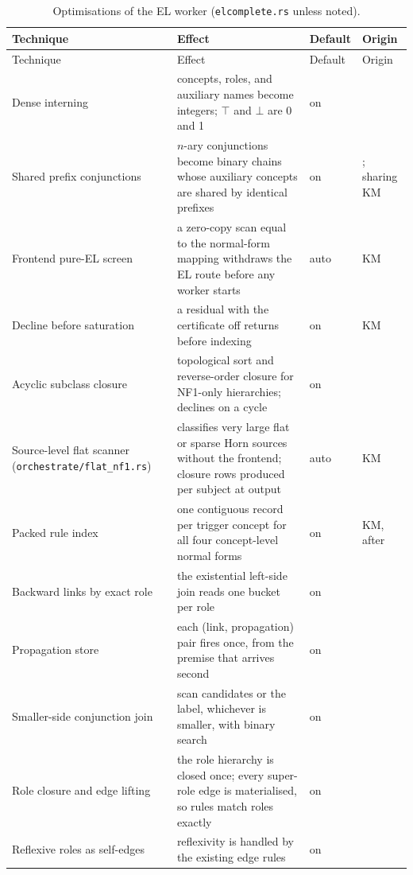\begin{small}
\begin{longtable}{@{}p{}p{}p{}p{}@{}}
\caption{Optimisations of the EL worker (\texttt{elcomplete.rs} unless noted).}
\label{tab:opt-el}\\
\toprule
Technique & Effect & Default & Origin\\
\midrule
\endfirsthead
\toprule
Technique & Effect & Default & Origin\\
\midrule
\endhead
Dense interning & concepts, roles, and auxiliary names become integers; $\top$ and $\bot$ are 0 and 1 & on & \cite{kazakov2014elk}\\
Shared prefix conjunctions & $n$-ary conjunctions become binary chains whose auxiliary concepts are shared by identical prefixes & on & \cite{baader2005el}; sharing KM\\
Frontend pure-EL screen & a zero-copy scan equal to the normal-form mapping withdraws the EL route before any worker starts & auto & KM\\
Decline before saturation & a residual with the certificate off returns before indexing & on & KM\\
Acyclic subclass closure & topological sort and reverse-order closure for NF1-only hierarchies; declines on a cycle & on & \cite{kahn1962topological}\\
Source-level flat scanner (\texttt{orchestrate/flat\_nf1.rs}) & classifies very large flat or sparse Horn sources without the frontend; closure rows produced per subject at output & auto & KM\\
Packed rule index & one contiguous record per trigger concept for all four concept-level normal forms & on & KM, after \cite{kazakov2014elk}\\
Backward links by exact role & the existential left-side join reads one bucket per role & on & \cite{kazakov2014elk}\\
Propagation store & each (link, propagation) pair fires once, from the premise that arrives second & on & \cite{kazakov2014elk}\\
Smaller-side conjunction join & scan candidates or the label, whichever is smaller, with binary search & on & \cite{kazakov2014elk}\\
Role closure and edge lifting & the role hierarchy is closed once; every super-role edge is materialised, so rules match roles exactly & on & \cite{baader2005el,baader2006cel}\\
Reflexive roles as self-edges & reflexivity is handled by the existing edge rules & on & \cite{baader2005el}\\

\end{longtable}
\end{small}
